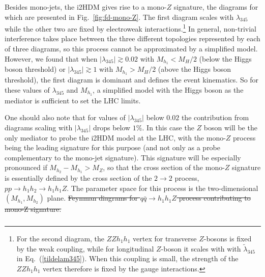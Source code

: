 \documentclass[12pt,a4paper]{article}
\providecommand{\DIFaddtex}[1]{{\protect\color{blue}\uwave{#1}}} %
\providecommand{\DIFdeltex}[1]{{\protect\color{red}\sout{#1}}}                      %
\providecommand{\DIFaddbegin}{} %
\providecommand{\DIFaddend}{} %
\providecommand{\DIFdelbegin}{} %
\providecommand{\DIFdelend}{} %
\providecommand{\DIFadd}[1]{\texorpdfstring{\DIFaddtex{#1}}{#1}} %
\providecommand{\DIFdel}[1]{\texorpdfstring{\DIFdeltex{#1}}{}} %
\begin{document}
\DIFaddend Besides mono-jets, the i2HDM gives rise to a mono-$Z$ signature, the 
diagrams for which are presented in Fig.~\ref{fig:fd-mono-Z}.
The first diagram scales with $\lambda_{345}$ while the other two are fixed by electroweak interactions.\footnote{For the second diagram, the $ZZh_1h_1$ vertex for transverse $Z$-bosons is fixed by the weak coupling,
while for longitudinal $Z$-boson it scales with with $\tilde\lambda_{345}$ in Eq.~(\ref{tildelam345}). 
When this coupling is small, the strength of the  $ZZh_1h_1$ vertex therefore
is fixed by the gauge interactions.}
In general, non-trivial interference takes place between the three different topologies represented by each of three 
diagrams, so  this process cannot be approximated by a simplified model.
However, we found that when $|\lambda_{345}|\gtrsim 0.02$ with $M_{h_1}< M_H/2$ (below the Higgs boson threshold)
or $|\lambda_{345}|\gtrsim 1$ with $M_{h_1}> M_H/2$ (above the Higgs boson threshold),
the first diagram is dominant and defines the event kinematics. 
So for these values of $\lambda_{345}$ and $M_{h_1}$, a simplified
model with the Higgs boson as the mediator is sufficient to set the LHC limits.

One should also note that for values of $|\lambda_{345}|$
below $0.02$ the contribution from diagrams scaling with $|\lambda_{345}|$
drops below $1\%$. In this case the
$Z$ boson will be the only mediator to probe the i2HDM model at the LHC,
with the mono-$Z$ process being the leading signature
for this purpose (and not only as a probe complementary to the mono-jet signature). 
This signature will be especially pronounced if $M_{h_2}-M_{h_1} > M_Z$,
so that the cross section of the mono-$Z$ signature
is essentially defined by the cross section of the $2 \to 2$ process,
$pp\to h_1 h_2 \to h_1 h_1 Z$.
The parameter space for this process is
the two-dimensional $(M_{h_1},M_{h_2})$ plane.
\DIFdelbegin %
{%
\DIFdel{Feynman diagrams for $q\bar{q}\to h_1 h_1Z$  process 
contributing to mono-Z signature.}}
\DIFdelend \DIFaddbegin 

\subsubsection{\DIFadd{Mono-Higgs production}}
\DIFaddend 
\end{document}
